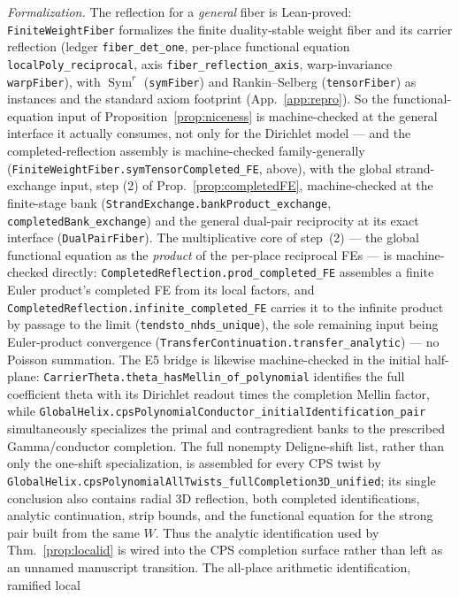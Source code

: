 \documentclass[11pt]{article}
\theoremstyle{definition}
\newcommand{\Sym}{\operatorname{Sym}}
\begin{document}
\emph{Formalization.} The reflection for a \emph{general} fiber is Lean-proved: \texttt{FiniteWeightFiber}
formalizes the finite duality-stable weight fiber and its
carrier reflection (ledger \texttt{fiber\_det\_one}, per-place functional equation
\texttt{localPoly\_reciprocal}, axis \texttt{fiber\_reflection\_axis}, warp-invariance
\texttt{warpFiber}), with $\Sym^r$ (\texttt{symFiber}) and Rankin--Selberg (\texttt{tensorFiber}) as
instances and the standard axiom footprint (App.~\ref{app:repro}).  So the functional-equation input of
Proposition~\ref{prop:niceness} is machine-checked at the general interface it actually consumes, not
only for the Dirichlet model --- and the completed-reflection assembly is machine-checked family-generally
(\texttt{FiniteWeightFiber.symTensorCompleted\_FE}, above), with the global strand-exchange input, step (2) of
Prop.~\ref{prop:completedFE}, machine-checked at the finite-stage bank
(\texttt{StrandExchange.bankProduct\_exchange}, \texttt{completedBank\_exchange}) and the general
dual-pair reciprocity at its exact interface (\texttt{DualPairFiber}).  The multiplicative core of
step~(2) --- the global functional equation as the \emph{product} of the per-place reciprocal FEs ---
is machine-checked directly: \texttt{CompletedReflection.prod\_completed\_FE} assembles a finite Euler
product's completed FE from its local factors, and \texttt{CompletedReflection.infinite\_completed\_FE}
carries it to the infinite product by passage to the limit (\texttt{tendsto\_nhds\_unique}), the sole
remaining input being Euler-product convergence (\texttt{TransferContinuation.transfer\_analytic}) ---
no Poisson summation.  The E5 bridge is likewise
machine-checked in the initial half-plane:
\texttt{CarrierTheta.theta\_hasMellin\_of\_polynomial} identifies the full coefficient theta
with its Dirichlet readout times the completion Mellin factor, while
\texttt{GlobalHelix.cpsPolynomialConductor\_initialIdentification\_pair} simultaneously
specializes the primal and contragredient banks to the prescribed Gamma/conductor completion.
The full nonempty Deligne-shift list, rather than only the one-shift specialization, is assembled
for every CPS twist by
\texttt{GlobalHelix.cpsPolynomialAllTwists\_fullCompletion3D\_unified}; its single conclusion also
contains radial 3D reflection, both completed identifications, analytic continuation, strip bounds,
and the functional equation for the strong pair built from the same $W$.  Thus the analytic
identification used by Thm.~\ref{prop:localid} is wired into the CPS completion surface rather than
left as an unnamed manuscript transition.  The all-place arithmetic identification, ramified local
\end{document}
